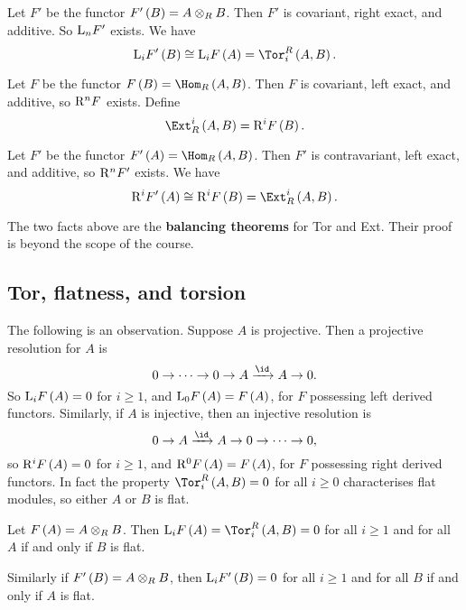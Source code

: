 \begin{fact*}
Let $ F' $ be the functor $ F'\br{B} = A \otimes_R B $. Then $ F' $ is covariant, right exact, and additive. So $ \mathrm{L}_nF' $ exists. We have
$$ \L_iF'\br{B} \cong \L_iF\br{A} = \Tor_i^R\br{A, B}. $$
\end{fact*}

\begin{definition}
Let $ F $ be the functor $ F\br{B} = \Hom_R\br{A, B} $. Then $ F $ is covariant, left exact, and additive, so $ \mathrm{R}^nF $ exists. Define
$$ \Ext_R^i\br{A, B} = \R^iF\br{B}. $$
\end{definition}

\begin{fact*}
Let $ F' $ be the functor $ F'\br{A} = \Hom_R\br{A, B} $. Then $ F' $ is contravariant, left exact, and additive, so $ \mathrm{R}^nF' $ exists. We have
$$ \R^iF'\br{A} \cong \R^iF\br{B} = \Ext_R^i\br{A, B}. $$
\end{fact*}

The two facts above are the \textbf{balancing theorems} for Tor and Ext. Their proof is beyond the scope of the course.

\subsection{Tor, flatness, and torsion}

The following is an observation. Suppose $ A $ is projective. Then a projective resolution for $ A $ is
$$ 0 \to \dots \to 0 \to A \xrightarrow{\id} A \to 0. $$
So $ \L_iF\br{A} = 0 $ for $ i \ge 1 $, and $ \L_0F\br{A} = F\br{A} $, for $ F $ possessing left derived functors. Similarly, if $ A $ is injective, then an injective resolution is
$$ 0 \to A \xrightarrow{\id} A \to 0 \to \dots \to 0, $$
so $ \R^iF\br{A} = 0 $ for $ i \ge 1 $, and $ \R^0F\br{A} = F\br{A} $, for $ F $ possessing right derived functors. In fact the property $ \Tor_i^R\br{A, B} = 0 $ for all $ i \ge 0 $ characterises flat modules, so either $ A $ or $ B $ is flat.

\begin{proposition}
Let $ F\br{A} = A \otimes_R B $. Then $ \L_iF\br{A} = \Tor_i^R\br{A, B} = 0 $ for all $ i \ge 1 $ and for all $ A $ if and only if $ B $ is flat.
\end{proposition}

Similarly if $ F'\br{B} = A \otimes_R B $, then $ \L_iF'\br{B} = 0 $ for all $ i \ge 1 $ and for all $ B $ if and only if $ A $ is flat.


